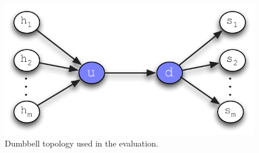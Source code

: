 %




\begin{figure}
  \centering
   \includegraphics[scale=0.71]{figs/pcount-setup.pdf}
\caption{Dumbbell topology used in the \pcnt evaluation.}
\label{fig:eval-pcount-setup}
\end{figure}

